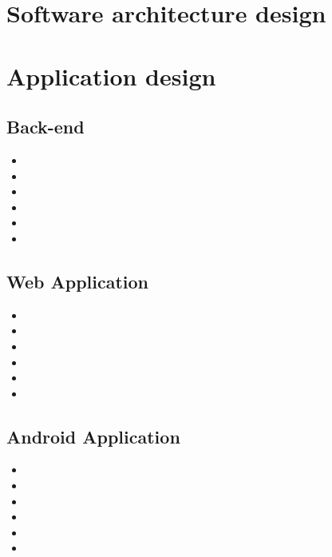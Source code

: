 \documentclass[12pt,a4paper]{article}
\author{Group 5}
\begin{document}
\section{Software architecture design}
\section{Application design}
\subsection{Back-end}
\begin{itemize}
\item
\item
\item
\item
\item
\item
\end{itemize}
\subsection{Web Application}
\begin{itemize}
\item
\item
\item
\item
\item
\item
\end{itemize}
\subsection{Android Application}
\begin{itemize}
\item
\item
\item
\item
\item
\item
\end{itemize}
\end{document}

